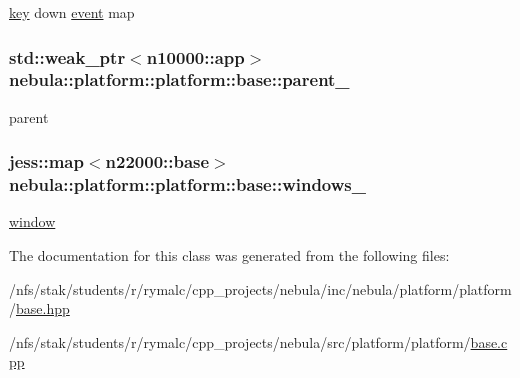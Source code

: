 \hyperlink{classnebula_1_1platform_1_1key}{key} down \hyperlink{structnebula_1_1platform_1_1platform_1_1base_1_1event}{event} map \hypertarget{classnebula_1_1platform_1_1platform_1_1base_a20c93586aaa0da756703ee2ac5ca9c7d}{
\subsubsection[{parent\_\-}]{\setlength{\rightskip}{0pt plus 5cm}std::weak\_\-ptr$<${\bf n10000::app}$>$ {\bf nebula::platform::platform::base::parent\_\-}}}
\label{classnebula_1_1platform_1_1platform_1_1base_a20c93586aaa0da756703ee2ac5ca9c7d}


parent \hypertarget{classnebula_1_1platform_1_1platform_1_1base_a9ac945d6a76a355ed39be20e5d802011}{
\subsubsection[{windows\_\-}]{\setlength{\rightskip}{0pt plus 5cm}jess::map$<${\bf n22000::base}$>$ {\bf nebula::platform::platform::base::windows\_\-}}}
\label{classnebula_1_1platform_1_1platform_1_1base_a9ac945d6a76a355ed39be20e5d802011}


\hyperlink{namespacenebula_1_1platform_1_1window}{window} 

The documentation for this class was generated from the following files:\begin{DoxyCompactItemize}
\item 
/nfs/stak/students/r/rymalc/cpp\_\-projects/nebula/inc/nebula/platform/platform/\hyperlink{inc_2nebula_2platform_2platform_2base_8hpp}{base.hpp}\item 
/nfs/stak/students/r/rymalc/cpp\_\-projects/nebula/src/platform/platform/\hyperlink{src_2platform_2platform_2base_8cpp}{base.cpp}\end{DoxyCompactItemize}
